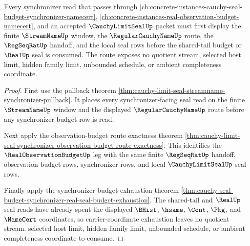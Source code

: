 \begin{theorem}
\label{thm:cauchy-limit-seal-synchronizer-tail-budget-nonescape}
Every synchronizer read that passes through \autoref{ch:concrete-instances-cauchy-seal-budget-synchronizer-namecert}, \autoref{ch:concrete-instances-real-observation-budget-namecert}, and an accepted $\CauchyLimitSealUp$ packet must first display the finite $\StreamNameUp$ window, the $\RegularCauchyNameUp$ route, the $\RegSeqRatUp$ handoff, and the local seal rows before the shared-tail budget or $\RealUp$ seal is consumed. The route exposes no quotient stream, selected host limit, hidden family limit, unbounded schedule, or ambient completeness coordinate.
\end{theorem}
\begin{proof}
First use the pullback theorem \autoref{thm:cauchy-limit-seal-streamname-synchronizer-pullback}. It places every synchronizer-facing seal read on the finite $\StreamNameUp$ window and the displayed $\RegularCauchyNameUp$ route before any synchronizer budget row is read.

Next apply the observation-budget route exactness theorem \autoref{thm:cauchy-limit-seal-synchronizer-observation-budget-route-exactness}. This identifies the $\RealObservationBudgetUp$ leg with the same finite $\RegSeqRatUp$ handoff, observation-budget rows, synchronizer rows, and local $\CauchyLimitSealUp$ seal rows.

Finally apply the synchronizer budget exhaustion theorem \autoref{thm:cauchy-seal-budget-synchronizer-real-seal-budget-exhaustion}. The shared-tail and $\RealUp$ seal reads have already spent the displayed $\BHist$, $\hsame$, $\Cont$, $\Pkg$, and $\NameCert$ coordinates, so carrier-coordinate exhaustion leaves no quotient stream, selected host limit, hidden family limit, unbounded schedule, or ambient completeness coordinate to consume.
\end{proof}

